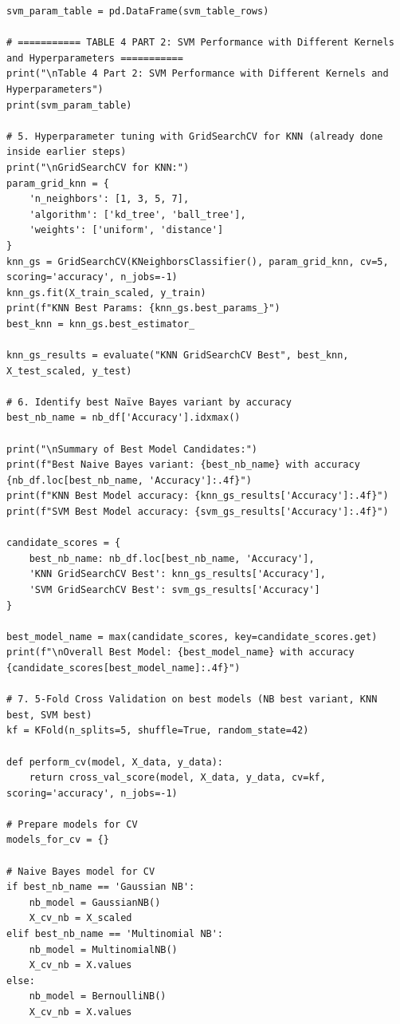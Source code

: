 \documentclass[12pt]{article}
\begin{document}
\begin{verbatim}
svm_param_table = pd.DataFrame(svm_table_rows)

# =========== TABLE 4 PART 2: SVM Performance with Different Kernels and Hyperparameters ===========
print("\nTable 4 Part 2: SVM Performance with Different Kernels and Hyperparameters")
print(svm_param_table)

# 5. Hyperparameter tuning with GridSearchCV for KNN (already done inside earlier steps)
print("\nGridSearchCV for KNN:")
param_grid_knn = {
    'n_neighbors': [1, 3, 5, 7],
    'algorithm': ['kd_tree', 'ball_tree'],
    'weights': ['uniform', 'distance']
}
knn_gs = GridSearchCV(KNeighborsClassifier(), param_grid_knn, cv=5, scoring='accuracy', n_jobs=-1)
knn_gs.fit(X_train_scaled, y_train)
print(f"KNN Best Params: {knn_gs.best_params_}")
best_knn = knn_gs.best_estimator_

knn_gs_results = evaluate("KNN GridSearchCV Best", best_knn, X_test_scaled, y_test)

# 6. Identify best Naïve Bayes variant by accuracy
best_nb_name = nb_df['Accuracy'].idxmax()

print("\nSummary of Best Model Candidates:")
print(f"Best Naive Bayes variant: {best_nb_name} with accuracy {nb_df.loc[best_nb_name, 'Accuracy']:.4f}")
print(f"KNN Best Model accuracy: {knn_gs_results['Accuracy']:.4f}")
print(f"SVM Best Model accuracy: {svm_gs_results['Accuracy']:.4f}")

candidate_scores = {
    best_nb_name: nb_df.loc[best_nb_name, 'Accuracy'],
    'KNN GridSearchCV Best': knn_gs_results['Accuracy'],
    'SVM GridSearchCV Best': svm_gs_results['Accuracy']
}

best_model_name = max(candidate_scores, key=candidate_scores.get)
print(f"\nOverall Best Model: {best_model_name} with accuracy {candidate_scores[best_model_name]:.4f}")

# 7. 5-Fold Cross Validation on best models (NB best variant, KNN best, SVM best)
kf = KFold(n_splits=5, shuffle=True, random_state=42)

def perform_cv(model, X_data, y_data):
    return cross_val_score(model, X_data, y_data, cv=kf, scoring='accuracy', n_jobs=-1)

# Prepare models for CV
models_for_cv = {}

# Naive Bayes model for CV
if best_nb_name == 'Gaussian NB':
    nb_model = GaussianNB()
    X_cv_nb = X_scaled
elif best_nb_name == 'Multinomial NB':
    nb_model = MultinomialNB()
    X_cv_nb = X.values
else:
    nb_model = BernoulliNB()
    X_cv_nb = X.values


\end{verbatim}
\end{document}
